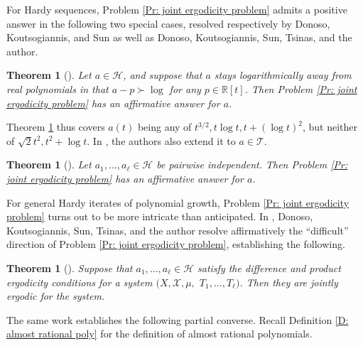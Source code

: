 \documentclass[11pt]{amsart}
\newtheorem{theorem}[lemma]{Theorem}
\theoremstyle{definition}
\newtheorem{definition}[lemma]{Definition}
\newcommand{\Q}{{\mathbb Q}}
\newcommand{\R}{{\mathbb R}}
\newcommand{\CH}{{\mathcal H}}
\newcommand{\CT}{{\mathcal T}}
\newcommand{\CX}{{\mathcal X}}
\newcommand{\1}{{\mathbf{1}}}
\begin{document}
For Hardy sequences, Problem \ref{Pr: joint ergodicity problem} admits a positive answer in the following two special cases, resolved respectively by Donoso, Koutsogiannis, and Sun as well as Donoso, Koutsogiannis, Sun, Tsinas, and the author.
\begin{theorem}[{\cite[Theorem 1.1]{DKS23}}]\label{T: DKS Hardy}
    Let $a\in\CH$, and suppose that $a$ \emph{stays logarithmically away from real polynomials} in that $a-p\succ \log$ for any $p\in\R[t]$. Then Problem \ref{Pr: joint ergodicity problem} has an affirmative answer for $a$.
\end{theorem}
Theorem \ref{T: DKS Hardy} thus covers $a(t)$ being any of $t^{3/2}, t\log t, t + (\log t)^2$, but neither of $\sqrt{2}t^2, t^2 + \log t$. In \cite[Theorem 6.1]{DKS23}, the authors also extend it to $a\in\CT$.
\begin{theorem}[{\cite[Theorem 1.9]{DKKST24}}]
    Let $a_1, \ldots, a_\ell\in\CH$ be pairwise independent. Then Problem \ref{Pr: joint ergodicity problem} has an affirmative answer for $a$.
\end{theorem}
For general Hardy iterates of polynomial growth, Problem \ref{Pr: joint ergodicity problem} turns out to be more intricate than anticipated. In \cite{DKKST25}, Donoso, Koutsogiannis, Sun, Tsinas, and the author resolve affirmatively the ``difficult'' direction of Problem \ref{Pr: joint ergodicity problem}, establishing the following. 
    \begin{theorem}[{\cite[Theorem 1.5]{DKKST25}}]\label{T: DKKST sufficient condition}
    Suppose that $a_{1},\dots,a_{\ell}\in\mathcal{H}$ satisfy the difference and product ergodicity conditions for a system $(X, \CX, \mu,$\! $T_1, \ldots, T_\ell)$.
Then they are jointly ergodic for the system.
     \end{theorem}

The same work establishes the following partial converse. Recall Definition \ref{D: almost rational poly} for the definition of almost rational polynomials.



\end{document}

